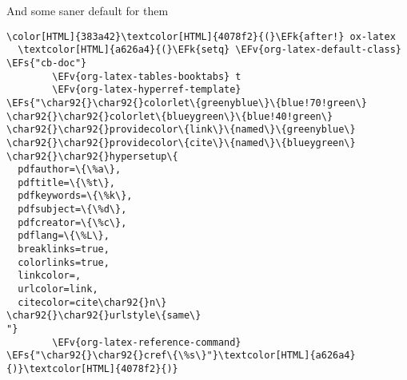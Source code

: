 \documentclass{scrartcl}
\newcommand{\EFk}[1]{\textcolor{EFk}{#1}} %
\newcommand{\EFs}[1]{\textcolor{EFs}{#1}} %
\newcommand{\EFv}[1]{\textcolor{EFv}{#1}} %
\begin{document}
\begin{enumerate}
And some saner default for them
\begin{Code}
\begin{Verbatim}[]
\color[HTML]{383a42}\textcolor[HTML]{4078f2}{(}\EFk{after!} ox-latex
  \textcolor[HTML]{a626a4}{(}\EFk{setq} \EFv{org-latex-default-class} \EFs{"cb-doc"}
        \EFv{org-latex-tables-booktabs} t
        \EFv{org-latex-hyperref-template} \EFs{"\char92{}\char92{}colorlet\{greenyblue\}\{blue!70!green\}
\char92{}\char92{}colorlet\{blueygreen\}\{blue!40!green\}
\char92{}\char92{}providecolor\{link\}\{named\}\{greenyblue\}
\char92{}\char92{}providecolor\{cite\}\{named\}\{blueygreen\}
\char92{}\char92{}hypersetup\{
  pdfauthor=\{\%a\},
  pdftitle=\{\%t\},
  pdfkeywords=\{\%k\},
  pdfsubject=\{\%d\},
  pdfcreator=\{\%c\},
  pdflang=\{\%L\},
  breaklinks=true,
  colorlinks=true,
  linkcolor=,
  urlcolor=link,
  citecolor=cite\char92{}n\}
\char92{}\char92{}urlstyle\{same\}
"}
        \EFv{org-latex-reference-command} \EFs{"\char92{}\char92{}cref\{\%s\}"}\textcolor[HTML]{a626a4}{)}\textcolor[HTML]{4078f2}{)}
\end{Verbatim}
\end{Code}


\end{enumerate}
\end{document}
